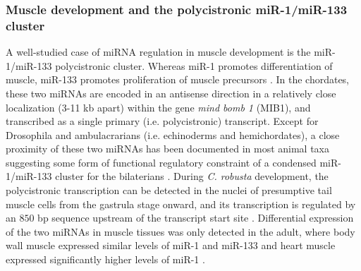 \documentclass[graybox]{svmult}
\begin{document}
\subsubsection{Muscle development and the polycistronic miR-1/miR-133 cluster}
A well-studied case of miRNA regulation in muscle development is the 
miR-1/miR-133 polycistronic cluster. Whereas miR-1 promotes differentiation of 
muscle, miR-133 promotes proliferation of muscle precursors \cite{Chen:2005yq}. 
In the chordates, these two miRNAs are encoded in an antisense direction in a 
relatively close localization (3-11 kb apart) within the gene \textit{mind bomb 
1} (MIB1), and transcribed as a single primary (i.e. polycistronic) transcript. 
Except for Drosophila and ambulacrarians (i.e. echinoderms and hemichordates), 
a close proximity of these two miRNAs has been documented in most animal taxa 
suggesting some form of functional regulatory constraint of a condensed 
miR-1/miR-133 cluster for the bilaterians \cite{Campo-Paysaa:2011}. 
During \textit{C. robusta} development, the polycistronic transcription can be 
detected in the nuclei of presumptive tail muscle cells from the gastrula stage 
onward, and its transcription is regulated by an $850$ bp sequence upstream of 
the transcript start site \cite{Kusakabe2013}. Differential 
expression of the two miRNAs in muscle tissues was only detected in the adult, 
where body wall muscle expressed similar levels of miR-1 and miR-133 and heart 
muscle expressed significantly higher levels of miR-1 \cite{Kusakabe2013}.
\end{document}
